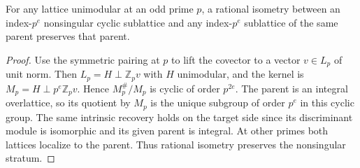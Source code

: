 \begin{lemma}\label{lem:quat-cyclic-recovery}
For any lattice unimodular at an odd prime $p$, a rational isometry between an index-$p^e$ nonsingular cyclic sublattice and any index-$p^e$ sublattice of the same parent preserves that parent.
\end{lemma}
\begin{proof}
Use the symmetric pairing at $p$ to lift the covector to a vector $v\in L_p$ of unit norm. Then $L_p=H\perp\mathbb Z_p v$ with $H$ unimodular, and the kernel is $M_p=H\perp p^e\mathbb Z_p v$. Hence $M_p^\#/M_p$ is cyclic of order $p^{2e}$. The parent is an integral overlattice, so its quotient by $M_p$ is the unique subgroup of order $p^e$ in this cyclic group. The same intrinsic recovery holds on the target side since its discriminant module is isomorphic and its given parent is integral. At other primes both lattices localize to the parent. Thus rational isometry preserves the nonsingular stratum.
\end{proof}

